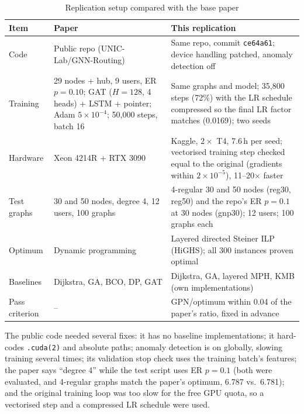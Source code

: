 \begin{table}[!htb]
\caption{Replication setup compared with the base paper}
\label{tab:repro_setup}
\begin{center}
\footnotesize
\renewcommand{\arraystretch}{1.1}
\begin{tabular}{|L{2.3cm}|L{5.0cm}|L{7.0cm}|}
\hline
\textbf{Item} & \textbf{Paper~\cite{wang2026gnn}} & \textbf{This replication} \\
\hline\hline
Code & Public repo (UNIC-Lab/GNN-Routing) & Same repo, commit \texttt{ce64a61}; device handling patched, anomaly detection off \\ \hline
Training & 29 nodes + hub, 9 users, ER $p=0.10$; GAT ($H=128$, 4 heads) + LSTM + pointer; Adam $5\times10^{-4}$; 50,000 steps, batch 16 & Same graphs and model; 35,800 steps (72\%) with the LR schedule compressed so the final LR factor matches (0.0169); two seeds \\ \hline
Hardware & Xeon 4214R + RTX 3090 & Kaggle, $2\times$ T4, 7.6\,h per seed; vectorised training step checked equal to the original (gradients within $2\times10^{-5}$), 11--20$\times$ faster \\ \hline
Test graphs & 30 and 50 nodes, degree 4, 12 users, 100 graphs & 4-regular 30 and 50 nodes (reg30, reg50) and the repo's ER $p=0.1$ at 30 nodes (gnp30); 12 users; 100 graphs each \\ \hline
Optimum & Dynamic programming & Layered directed Steiner ILP (HiGHS); all 300 instances proven optimal \\ \hline
Baselines & Dijkstra, GA, BCO, DP, GAT & Dijkstra, GA, layered MPH, KMB (own implementations) \\ \hline
Pass criterion & -- & GPN/optimum within 0.04 of the paper's ratio, fixed in advance \\
\hline
\end{tabular}
\end{center}
\end{table}

\noindent The public code needed several fixes: it has no baseline implementations; it hard-codes \texttt{.cuda(2)} and absolute paths; anomaly detection is on globally, slowing training several times; its validation stop check uses the training batch's features; the paper says ``degree 4'' while the test script uses ER $p=0.1$ (both were evaluated, and 4-regular graphs match the paper's optimum, 6.787 vs.\ 6.781); and the original training loop was too slow for the free GPU quota, so a vectorised step and a compressed LR schedule were used.

